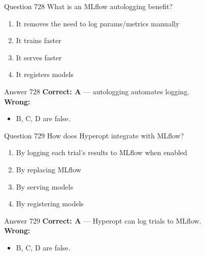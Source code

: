 \documentclass[aspectratio=169,11pt]{beamer}
\begin{document}
	\begin{frame}{Question 728}
		What is an MLflow autologging benefit?
		\begin{enumerate}[label=\Alph*.]
			\item It removes the need to log params/metrics manually
			\item It trains faster
			\item It serves faster
			\item It registers models
		\end{enumerate}
	\end{frame}
	\begin{frame}{Answer 728}
		\textbf{Correct: A} --- autologging automates logging.\\
		\vspace{0.5em}
		\textbf{Wrong:}
		\begin{itemize}
			\item B, C, D are false.
		\end{itemize}
	\end{frame}
	
	\begin{frame}{Question 729}
		How does Hyperopt integrate with MLflow?
		\begin{enumerate}[label=\Alph*.]
			\item By logging each trial's results to MLflow when enabled
			\item By replacing MLflow
			\item By serving models
			\item By registering models
		\end{enumerate}
	\end{frame}
	\begin{frame}{Answer 729}
		\textbf{Correct: A} --- Hyperopt can log trials to MLflow.\\
		\vspace{0.5em}
		\textbf{Wrong:}
		\begin{itemize}
			\item B, C, D are false.
		\end{itemize}
	\end{frame}
	
\end{document}
